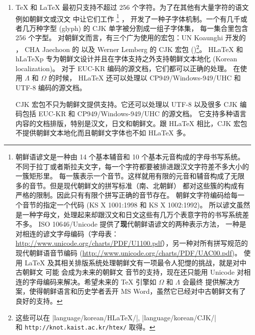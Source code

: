 \begin{enumerate}
\item
\TeX{} 和 \LaTeX{} 最初只支持不超过 256 个字符。为了在其他有大量字符的语文例如朝鲜文或汉文
中让它们工作
 \footnote{朝鲜语谚文是一种由 14 个基本辅音和 10 个基本元音构成的字母书写系统。
 不同于拉丁或者斯拉夫文字，每一个字符都要被排进跟汉文字符差不多大小的一簇矩形里。
每一簇表示一个音节。这样就用有限的元音和辅音构成了无限多的音节。但是现代朝鲜文的拼写标准（南、北朝鲜）
都对这些簇的构成有严格的限制。因此只有有限个拼写正确的音节存在。
朝鲜文字符编码给每一个音节的指定一个代码 (KS X 1001:1998 和 KS X 1002:1992)。
所以谚文虽然是一种字母文，处理起来却跟汉文和日文这些有几万个表意字符的书写系统差不多。
ISO 10646/Unicode 提供了{\textbf 现代}朝鲜语谚文的两种表示方法，
一种是对相连的谚文字母编码（字母表：
\url{http://www.unicode.org/charts/PDF/U1100.pdf}），另一种对所有拼写规范的现代朝鲜语音节编码 (\url{http://www.unicode.org/charts/PDF/UAC00.pdf})。
 使用 \LaTeX{} 及其相关排版系统处理朝鲜文有一项最令人犯憷的挑战，就是对中古朝鲜文 \pozhehao 可能
 会成为未来的朝鲜文 \pozhehao 音节的支持，现在还只能用 Unicode 对相连的字母编码来解决。希望未来的 \TeX{} 引擎如 $\Omega$ 和 $\Lambda$ 会最终
 提供解决方案，使得朝鲜语言和历史学者丢开 MS Word，虽然它已经对中古朝鲜文有了良好的支持。}
，
开发了一种子字体机制。一个有几千或者几万种字型 (glyph) 的 CJK 单字被分割成一组子字体集，
每一集合里包含 256 个字型。
对朝鲜文而言，有三个广为使用的宏包：UN Koaunghi 开发的 ，
CHA Jaechoon 的  以及 Werner Lemberg 的 CJK 宏包 ()\footnote{%
这些可以在 \CTANref|language/korean/HLaTeX/|, \CTANref|language/korean/CJK/|\\
和 \texttt{http://knot.kaist.ac.kr/htex/} 取得。}。
H\LaTeX{} 和 h\LaTeX{}p 专为朝鲜文设计并且在字体支持之外支持朝鲜文本地化 (Korean
localization)。 对于 EUC-KR 编码的源文档，它们都可以正确的处理。
在使用 $\Lambda$ 和 $\Omega$ 的时候，
H\LaTeX{} 还可以处理以 CP949/Windows-949/UHC 和 UTF-8 编码的源文档。

CJK 宏包不只为朝鲜文提供支持。它还可以处理以 UTF-8 以及很多 CJK 编码包括 EUC-KR 和 
CP949/Windows-949/UHC 的源文档。
它支持多种语言内容的文档排版，特别是汉文，日文和朝鲜文。跟 H\LaTeX{} 相比，CJK 宏包
不提供朝鲜文本地化而且朝鲜文字体也不如 H\LaTeX{} 多。


\end{enumerate}
